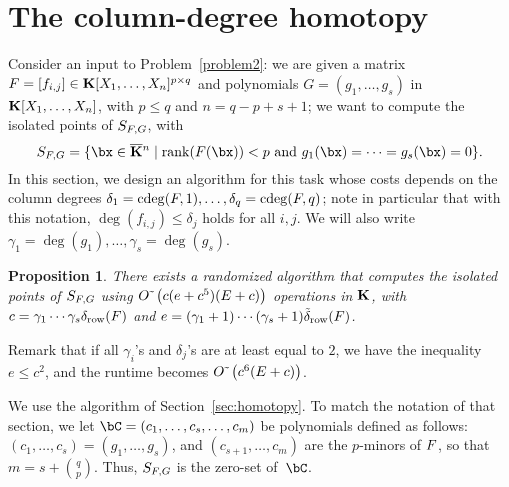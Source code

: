 \documentclass[12pt]{article}
\newtheorem{proposition}[definition]{Proposition}
\begin{document}
\section{The column-degree homotopy}\label{sec:columndegree}

Consider an input to Problem~\ref{problem2}: we are given a matrix
${F} =[f_{i,j}]\in \mathbf{K}[X_1,\dots,X_n]^{p \times q}$ and polynomials
$G=(g_1,\dots,g_s)$ in $\mathbf{K}[X_1,\dots,X_n]$, with $p \leq q$ and $n =
q-p+s+1$; we want to compute the isolated points of $S_{{F},G}$,
with
$$S_{\mF,G} = \{\bx \in \KKbar{}^n \mid  \mathrm{rank}(\mF({\bx})) < p
\text{~and~} g_1(\bx)=\cdots=g_s(\bx)=0\}.$$ In this section, we
design an algorithm for this task whose costs depends on the column
degrees $\delta_1=\mathrm{cdeg}({F},1),\dots,\delta_q=\mathrm{cdeg}({F},q)$; note in particular
that with this notation, $\deg(f_{i,j}) \leq \delta_j$ holds for all $i,j$.
We will also write $\gamma_1=\deg(g_1),\dots,\gamma_s=\deg(g_s)$.

\begin{proposition}
  There exists a randomized algorithm that computes the isolated
  points of $S_{{F},G}$ using ${O}{\,\tilde{ }\,}\left (c(e+c^5 )(E + c)\right)$
  operations in $\mathbf{K}$, with $c=\gamma_1\cdots\gamma_s \delta_{\rm
    row}({F})$ and $e=(\gamma_1+1)\cdots(\gamma_s+1) \tilde\delta_{\rm
    row}({F})$.
\end{proposition}
Remark that if all $\gamma_i$'s and $\delta_j$'s are at least equal to
$2$, we have the inequality $e \le c^2$, and the runtime becomes
${O}{\,\tilde{ }\,}\left (c^6 (E + c)\right)$.

\medskip

We use the algorithm of Section~\ref{sec:homotopy}. To match the
notation of that section, we let $\bC=(c_1,\dots,c_{s},\dots,c_m)$ be
polynomials defined as follows: $(c_1,\dots,c_{s})=(g_1,\dots,g_s)$,
and $(c_{s+1},\dots,c_{m})$ are the $p$-minors of ${F}$, so that 
$m=s+{q \choose p}$. Thus, $S_{{F},G}$ is the zero-set of~$\bC$.
\end{document}
